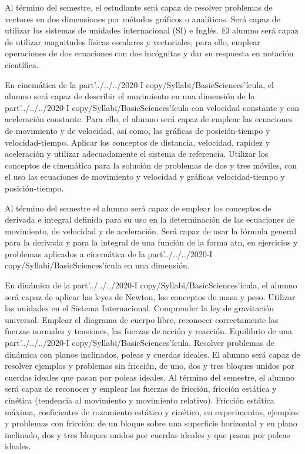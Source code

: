 \begin{syllabus}
\begin{goals}
\item Al término del semestre, el estudiante será capaz de resolver problemas de vectores en dos dimensiones por métodos gráficos o analíticos. Será capaz de utilizar los sistemas de unidades internacional (SI) e Inglés. El alumno será capaz de utilizar magnitudes físicas escalares y vectoriales, para ello, emplear operaciones de dos ecuaciones con dos incógnitas y dar su respuesta en notación científica.
\item En cinemática de la part'../../../2020-I copy/Syllabi/BasicSciences'ícula, el alumno será capaz de describir el movimiento en una dimensión de la part'../../../2020-I copy/Syllabi/BasicSciences'ícula con velocidad constante y con aceleración constante. Para ello, el alumno será capaz de emplear las ecuaciones de movimiento y de velocidad, así como, las gráficas de posición-tiempo y velocidad-tiempo. Aplicar los conceptos de distancia, velocidad, rapidez y aceleración y utilizar adecuadamente el sistema de referencia. Utilizar los conceptos de cinemática para la solución de problemas de dos y tres móviles, con el uso las ecuaciones de movimiento y velocidad y gráficas velocidad-tiempo y posición-tiempo.
\item Al término del semestre el alumno será capaz de emplear los conceptos de derivada e integral definida para su uso en la determinación de las ecuaciones de movimiento, de velocidad y de aceleración. Será capaz de usar la fórmula general para la derivada y para la integral de una función de la forma atn, en ejercicios y problemas aplicados a cinemática de la part'../../../2020-I copy/Syllabi/BasicSciences'ícula en una dimensión.
\item En dinámica de la part'../../../2020-I copy/Syllabi/BasicSciences'ícula, el alumno será capaz de aplicar las leyes de Newton, los conceptos de masa y peso. Utilizar las unidades en el Sistema Internacional. Comprender la ley de gravitación universal. Emplear el diagrama de cuerpo libre, reconocer correctamente las fuerzas normales y tensiones, las fuerzas de acción y reacción. Equilibrio de una part'../../../2020-I copy/Syllabi/BasicSciences'ícula. Resolver problemas de dinámica con planos inclinados, poleas y cuerdas ideales. El alumno será capaz de resolver ejemplos y problemas sin fricción, de uno, dos y tres bloques unidos por cuerdas ideales que pasan por poleas ideales. Al término del semestre, el alumno será capaz de reconocer y emplear las fuerzas de fricción, fricción estática y cinética (tendencia al movimiento y movimiento relativo). Fricción estática máxima, coeficientes de rozamiento estático y cinético, en experimentos, ejemplos y problemas con fricción: de un bloque sobre una superficie horizontal y en plano inclinado, dos y tres bloques unidos por cuerdas ideales y que pasan por poleas ideales.
\end{goals}


\end{syllabus}
